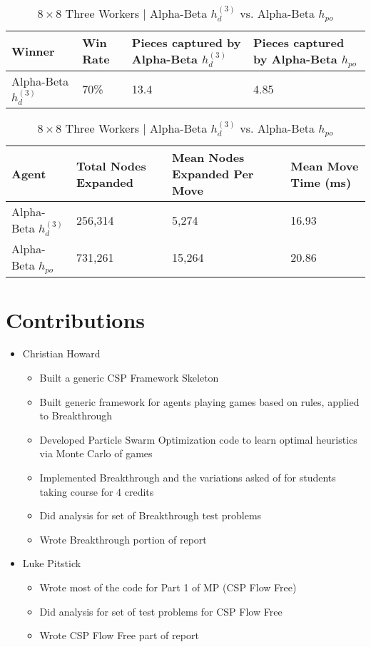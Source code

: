 \documentclass{article}[12pt]
\begin{document}
\begin{table}[ht]
	\centering
	\begin{tabular}{l | l | l | l}
		\hline
		Winner & Win Rate & Pieces captured by Alpha-Beta $h_{d}^{(3)}$ & Pieces captured by Alpha-Beta $h_{po}$ \\
		\hline \hline 
		Alpha-Beta $h_{d}^{(3)}$  & 70\% & 13.4 & 4.85 \\
		\hline
	\end{tabular}
	
	\vspace{10px}
	
	\begin{tabular}{l | l | l | l}
		\hline
		Agent & Total Nodes Expanded & Mean Nodes Expanded Per Move & Mean Move Time (ms) \\
		\hline \hline 
		Alpha-Beta $h_{d}^{(3)}$  & 256,314& 5,274 & 16.93 \\
		Alpha-Beta $h_{po}$ & 731,261 & 15,264 & 20.86\\
		\hline
	\end{tabular}
	\caption{$8 \times8 $ Three Workers | Alpha-Beta $h_{d}^{(3)}$ vs. Alpha-Beta $h_{po}$} \label{tab:t33}
\end{table}

\newpage
\section{Contributions}
\begin{itemize}
\item Christian Howard
	\begin{itemize}
	\item Built a generic CSP Framework Skeleton
	\item Built generic framework for agents playing games based on rules, applied to Breakthrough
	\item Developed Particle Swarm Optimization code to learn optimal heuristics via Monte Carlo of games
	\item Implemented Breakthrough and the variations asked of for students taking course for 4 credits
	\item Did analysis for set of Breakthrough test problems
	\item Wrote Breakthrough portion of report
	\end{itemize}
\item Luke Pitstick
	\begin{itemize}
	\item Wrote most of the code for Part 1 of MP (CSP Flow Free)
	\item Did analysis for set of test problems for CSP Flow Free
	\item Wrote CSP Flow Free part of report
	\end{itemize}
\end{itemize}   
   
\end{document}
